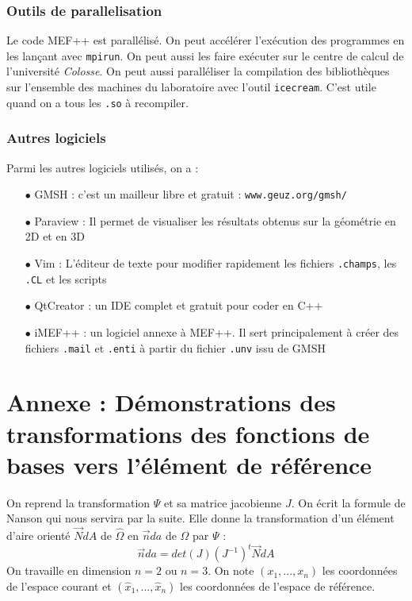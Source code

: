 \documentclass[a4paper,12pt]{article}
\begin{document}
\subsubsection{Outils de parallelisation}
Le code MEF++ est parallélisé. On peut accélérer l'exécution des programmes en les lançant avec \texttt{mpirun}. 
On peut aussi les faire exécuter sur le centre de calcul de l'université \emph{Colosse}.
\newline
\newline
On peut aussi paralléliser la compilation des bibliothèques sur l'ensemble des machines du laboratoire avec l'outil \texttt{icecream}.
C'est utile quand on a tous les \texttt{.so} à recompiler.
\subsubsection{Autres logiciels}
Parmi les autres logiciels utilisés, on a :
\begin{itemize}
\item[$\bullet$] GMSH : c'est un mailleur libre et gratuit : \texttt{www.geuz.org/gmsh/}
\item[$\bullet$] Paraview : Il permet de visualiser les résultats obtenus sur la géométrie en 2D et en 3D
\item[$\bullet$] Vim : L'éditeur de texte pour modifier rapidement les fichiers \texttt{.champs}, les \texttt{.CL} et les scripts
\item[$\bullet$] QtCreator : un IDE complet et gratuit pour coder en C++
\item[$\bullet$] iMEF++ : un logiciel annexe à MEF++. Il sert principalement à créer des fichiers \texttt{.mail} et \texttt{.enti} à partir du fichier \texttt{.unv} issu de GMSH
\end{itemize}
\newpage
\section{Annexe : Démonstrations des transformations des fonctions de bases vers l'élément de référence}
On reprend la transformation $\Psi$ et sa matrice jacobienne $J$. On écrit la formule de Nanson \cite{ref} qui nous servira par la suite.
Elle donne la transformation d'un élément d'aire orienté $\vec{N}dA$ de $\hat{\Omega}$ en $\vec{n}da$ de $\Omega$
par $\Psi$ :
\[
\vec{n}da = det(J)(J^{-1})^{t}\vec{N}dA
\]
On travaille en dimension $n=2$ ou $n=3$. On note $(x_{1},...,x_{n})$  les coordonnées de l'espace courant et 
$(\hat{x}_{1},...,\hat{x}_{n})$ les coordonnées de l'espace de référence.
\end{document}
